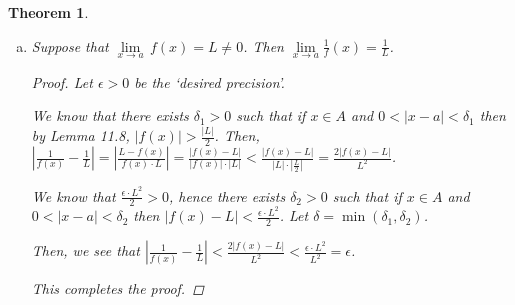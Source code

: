 \documentclass[11pt]{article}
\renewcommand{\_}[1]{\underline{ #1 }}
\newtheorem{theorem}{Theorem}[section]
\theoremstyle{definition}
\numberwithin{equation}{subsection}
\begin{document}
\begin{theorem}
\begin{enumerate}[(a)]
\begin{proof}
Thus, we have shown that $|(fg)(x)-LM|<\epsilon$. This completes the proof.


\renewcommand\qedsymbol{QED}
\end{proof}


		\item Suppose that $\lim\limits_{x \to a} \, f(x) = L \neq 0$. Then $\lim\limits_{x \to a} \frac{1}{f}(x) = \frac{1}{L}$.
            
\begin{proof}
Let $\epsilon>0$ be the `desired precision'. 

We know that there exists $\delta_1>0$ such that if $x \in A$ and $0<|x-a|<\delta_1$ then by Lemma 11.8, $|f(x)|>\frac{|L|}{2}$. Then, $|\frac{1}{f(x)}-\frac{1}{L}|=|\frac{L-f(x)}{f(x)\cdot L}|=\frac{|f(x)-L|}{|f(x)|\cdot |L|} <\frac{|f(x)-L|}{|L|\cdot |\frac{L}{2}|} =\frac{2|f(x)-L|}{L^2}$.   

We know that $\frac{\epsilon\cdot L^2}{2}>0$, hence there exists $\delta_2>0$ such that if $x \in A$ and $0<|x-a|<\delta_2$ then $|f(x)-L|<\frac{\epsilon\cdot L^2}{2}$. Let $\delta = \min(\delta_1, \delta_2)$. 

Then, we see that $|\frac{1}{f(x)}-\frac{1}{L}|<\frac{2|f(x)-L|}{L^2}<\frac{\epsilon \cdot L^2}{L^2}=\epsilon$. 

This completes the proof.

\renewcommand\qedsymbol{QED}
\end{proof}


	\end{enumerate}
\end{theorem}
\end{document}
